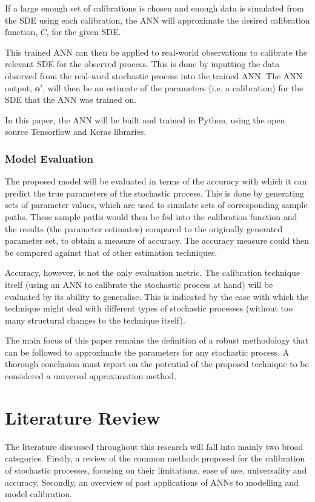 \documentclass[11pt,oneside,openany,a4paper,english, report, goldenblock
]{usthesis}
\begin{document}
If a large enough set of calibrations is chosen and enough data is simulated from the SDE using each calibration, the ANN will approximate the desired calibration function, $C$, for the given SDE.


This trained ANN can then be applied to real-world observations to calibrate the relevant SDE for the observed process.  This is done by inputting the data observed from the real-word stochastic process into the trained ANN. The ANN output, $\mathbf{o'}$, will then be an estimate of the parameters (i.e. a calibration) for the SDE that the ANN was trained on.


In this paper, the ANN will be built and trained in Python, using the open source Tensorflow and Keras libraries.

\subsection{Model Evaluation}

The proposed model will be evaluated in terms of the accuracy with which it can predict the true parameters of the stochastic process. This is done by generating sets of parameter values, which are used to simulate sets of corresponding sample paths. These sample paths would then be fed into the calibration function and the results (the parameter estimates) compared to the originally generated parameter set, to obtain a measure of accuracy. The accuracy measure could then be compared against that of other estimation techniques. 
\par
Accuracy, however, is not the only evaluation metric. The calibration technique itself (using an ANN to calibrate the stochastic process at hand) will be evaluated by its ability to generalise. This is indicated by the ease with which the technique might deal with different types of stochastic processes (without too many structural changes to the technique itself). 


The main focus of this paper remains the definition of a robust methodology that can be followed to approximate the parameters for any stochastic process. A thorough conclusion must report on the potential of the proposed technique to be considered a universal approximation method.


\chapter{Literature Review}
The literature discussed throughout this research will fall into mainly two broad categories. Firstly, a review of the common methods proposed for the calibration of stochastic processes, focusing on their limitations, ease of use, universality and accuracy. Secondly, an overview of past applications of ANNs to modelling and model calibration. 
\end{document}
